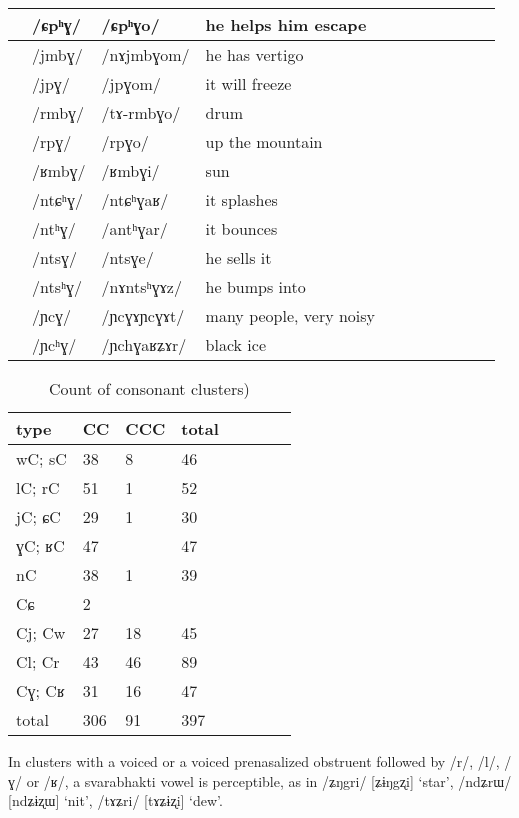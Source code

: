 \documentclass[oldfontcommands,oneside,a4paper,11pt]{article}
\newcommand{\ipa}[1]{/#1/} %
\newcommand{\idph}[1]{\cellcolor{gray}\textbf{#1}}
\begin{document}
\begin{table}
{\begin{tabular}{l|lll|lll|lll|l}
\midrule
&	\ipa{ɕpʰɣ}  &	\ipa{ɕpʰɣo}  &he helps him escape	&&&\\	
\midrule
&	\ipa{jmbɣ}  &	\ipa{nɤjmbɣom}  &	he has vertigo&&&\\	
&	\ipa{jpɣ}  &	\ipa{jpɣom}  &it will freeze	&&&\\	
\midrule
 &	\ipa{rmbɣ}  &	\ipa{tɤ-rmbɣo}  &drum	&&&\\	
&	\ipa{rpɣ}  &	\ipa{rpɣo}  &up the mountain	&&&\\	
\midrule
&	\ipa{ʁmbɣ}  &	\ipa{ʁmbɣi}  &	sun&&&\\	
\midrule
&	\ipa{ntɕʰɣ}  &	\ipa{ntɕʰɣaʁ}  &it splashes	&&&\\	
&	\ipa{ntʰɣ}  &	\ipa{antʰɣar}  &	it bounces&&&\\	
&	\ipa{ntsɣ}  &	\ipa{ntsɣe}  &he sells it	&&&\\	
&	\ipa{ntsʰɣ}  &	\ipa{nɤntsʰɣɤz}  &he bumps into	&&&\\	
&	\ipa{ɲcɣ}\idph{}  &	\ipa{ɲcɣɤɲcɣɤt}  &	many people, very noisy&&&\\	
&	\ipa{ɲcʰɣ}  &	\ipa{ɲchɣaʁʑɤr}  &black ice	&&&\\	
\end{tabular}}
\end{table}	
						
		   \begin{table}
 \caption{Count of consonant clusters)} \label{tab:clusters.tot}  \centering
\begin{tabular}{llllllll}
\toprule		
type &CC& CCC& total\\		
\midrule
wC; sC  & 	38  & 	8  & 	46  & 	\\	
lC; rC  & 	51  & 	1  & 	52  & 	\\	
jC; ɕC  & 	29  & 	1  & 	30  & 	\\	
ɣC; ʁC  & 	47  & 	  & 	47  & 	\\	
nC  & 	38  & 	1  & 	39  & 	\\	
\midrule
Cɕ  & 	2  & 	  & 	  & 	\\	
\midrule
Cj; Cw  & 	27  & 	18  & 	45  & 	\\	
Cl; Cr  & 	43  & 	46  & 	89  & 	\\	
Cɣ; Cʁ  & 	31  & 	16  & 	47  & 	\\	
\midrule
total  & 	306  & 	91  & 	397  & 	\\	
\bottomrule
\end{tabular}
\end{table}
 
In clusters with a voiced or a voiced prenasalized obstruent followed by \ipa{r}, \ipa{l}, \ipa{ɣ} or \ipa{ʁ}, a  svarabhakti vowel is perceptible, as in \ipa{ʑŋgri} [ʑɨŋgʐi] `star', \ipa{ndʑrɯ} [ndʑɨʐɯ] `nit', \ipa{tɤʑri} [tɤʑɨʐi] `dew'.
 
\end{document}
